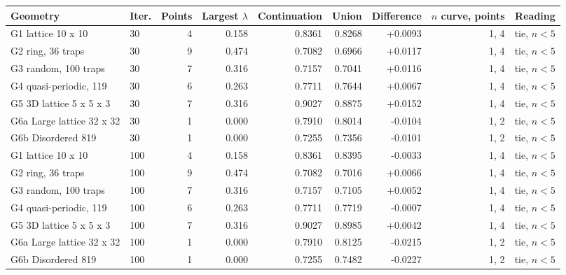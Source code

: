 \begin{tabular}{@{}llrrrrrrr@{}}
\toprule
Geometry & Iter. & Points & Largest $\lambda$ & Continuation & Union & Difference & $n$ curve, points & Reading \\
\midrule
G1 lattice 10 x 10 & 30 & 4 & 0.158 & 0.8361 & 0.8268 & +0.0093 & 1, 4 & tie, $n<5$ \\
G2 ring, 36 traps & 30 & 9 & 0.474 & 0.7082 & 0.6966 & +0.0117 & 1, 4 & tie, $n<5$ \\
G3 random, 100 traps & 30 & 7 & 0.316 & 0.7157 & 0.7041 & +0.0116 & 1, 4 & tie, $n<5$ \\
G4 quasi-periodic, 119 & 30 & 6 & 0.263 & 0.7711 & 0.7644 & +0.0067 & 1, 4 & tie, $n<5$ \\
G5 3D lattice 5 x 5 x 3 & 30 & 7 & 0.316 & 0.9027 & 0.8875 & +0.0152 & 1, 4 & tie, $n<5$ \\
G6a Large lattice 32 x 32 & 30 & 1 & 0.000 & 0.7910 & 0.8014 & -0.0104 & 1, 2 & tie, $n<5$ \\
G6b Disordered 819 & 30 & 1 & 0.000 & 0.7255 & 0.7356 & -0.0101 & 1, 2 & tie, $n<5$ \\
G1 lattice 10 x 10 & 100 & 4 & 0.158 & 0.8361 & 0.8395 & -0.0033 & 1, 4 & tie, $n<5$ \\
G2 ring, 36 traps & 100 & 9 & 0.474 & 0.7082 & 0.7016 & +0.0066 & 1, 4 & tie, $n<5$ \\
G3 random, 100 traps & 100 & 7 & 0.316 & 0.7157 & 0.7105 & +0.0052 & 1, 4 & tie, $n<5$ \\
G4 quasi-periodic, 119 & 100 & 6 & 0.263 & 0.7711 & 0.7719 & -0.0007 & 1, 4 & tie, $n<5$ \\
G5 3D lattice 5 x 5 x 3 & 100 & 7 & 0.316 & 0.9027 & 0.8985 & +0.0042 & 1, 4 & tie, $n<5$ \\
G6a Large lattice 32 x 32 & 100 & 1 & 0.000 & 0.7910 & 0.8125 & -0.0215 & 1, 2 & tie, $n<5$ \\
G6b Disordered 819 & 100 & 1 & 0.000 & 0.7255 & 0.7482 & -0.0227 & 1, 2 & tie, $n<5$ \\
\bottomrule
\end{tabular}
